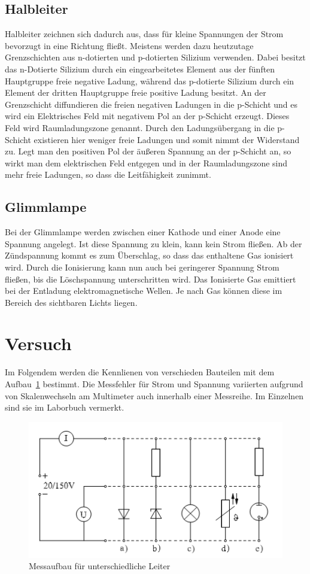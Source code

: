 \subsection{Halbleiter}
Halbleiter zeichnen sich dadurch aus, dass für kleine Spannungen der Strom bevorzugt in eine Richtung fließt. Meistens werden dazu heutzutage Grenzschichten aus n-dotierten und p-dotierten Silizium verwenden. Dabei besitzt das n-Dotierte Silizium durch ein eingearbeitetes Element aus der fünften Hauptgruppe freie negative Ladung, während das p-dotierte Silizium durch ein Element der dritten Hauptgruppe freie positive Ladung besitzt. An der Grenzschicht diffundieren die freien negativen Ladungen in die p-Schicht und es wird ein Elektrisches Feld mit negativem Pol an der p-Schicht erzeugt. Dieses Feld wird Raumladungszone genannt. Durch den Ladungsübergang in die p-Schicht existieren hier weniger freie Ladungen und somit nimmt der Widerstand zu. Legt man den positiven Pol der äußeren Spannung an der p-Schicht an, so wirkt man dem elektrischen Feld entgegen und in der Raumladungszone sind mehr freie Ladungen, so dass die Leitfähigkeit zunimmt.

\subsection{Glimmlampe}
Bei der Glimmlampe werden zwischen einer Kathode und einer Anode eine Spannung angelegt. Ist diese Spannung zu klein, kann kein Strom fließen. Ab der Zündspannung kommt es zum Überschlag, so dass das enthaltene Gas ionisiert wird. Durch die Ionisierung kann nun auch bei geringerer Spannung Strom fließen, bis die Löschspannung unterschritten wird. Das Ionisierte Gas emittiert bei der Entladung elektromagnetische Wellen. Je nach Gas können diese im Bereich des sichtbaren Lichts liegen. 

\section{Versuch}
Im Folgendem werden die Kennlienen von verschieden Bauteilen mit dem Aufbau~\ref{fig:aufbau} bestimmt. Die Messfehler für Strom und Spannung variierten aufgrund von Skalenwechseln am Multimeter auch innerhalb einer Messreihe. Im Einzelnen sind sie im Laborbuch vermerkt.
\begin{figure}[H]
	\centering
	\includegraphics[width=.8\textwidth]{Aufbau.png}
	\caption{Messaufbau für unterschiedliche Leiter}
	\label{fig:aufbau}
\end{figure}
